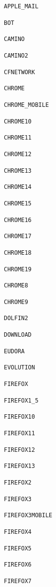 \documentclass[11pt,a4paper,titlepage]{article}
\begin{document}
\begin{multicols}{4}

    \small \texttt{APPLE\_MAIL}

    \small \texttt{BOT}

    \small \texttt{CAMINO}

    \small \texttt{CAMINO2}

    \small \texttt{CFNETWORK}

    \small \texttt{CHROME}

    \small \texttt{CHROME\_MOBILE}

    \small \texttt{CHROME10}

    \small \texttt{CHROME11}

    \small \texttt{CHROME12}

    \small \texttt{CHROME13}

    \small \texttt{CHROME14}

    \small \texttt{CHROME15}

    \small \texttt{CHROME16}

    \small \texttt{CHROME17}

    \small \texttt{CHROME18}

    \small \texttt{CHROME19}

    \small \texttt{CHROME8}

    \small \texttt{CHROME9}

    \small \texttt{DOLFIN2}

    \small \texttt{DOWNLOAD}

    \small \texttt{EUDORA}

    \small \texttt{EVOLUTION}

    \small \texttt{FIREFOX}

    \small \texttt{FIREFOX1\_5}

    \small \texttt{FIREFOX10}

    \small \texttt{FIREFOX11}

    \small \texttt{FIREFOX12}

    \small \texttt{FIREFOX13}

    \small \texttt{FIREFOX2}

    \small \texttt{FIREFOX3}

    \small \texttt{FIREFOX3MOBILE}

    \small \texttt{FIREFOX4}

    \small \texttt{FIREFOX5}

    \small \texttt{FIREFOX6}

    \small \texttt{FIREFOX7}


\end{multicols}
\end{document}

